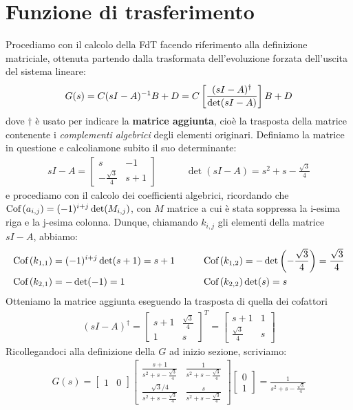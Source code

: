 \documentclass[a4paper, 11pt]{article}
\begin{document}
\section{Funzione di trasferimento}
Procediamo con il calcolo della FdT facendo riferimento alla definizione matriciale, ottenuta partendo dalla trasformata dell'evoluzione forzata dell'uscita del sistema lineare:
\begin{align*}
	G(s) = C(sI-A)^{-1}B +D = C\left[ \frac{(sI-A)^\dag}{\det(sI-A)} \right]B + D
\end{align*}
dove $\dag$ è usato per indicare la \textbf{matrice aggiunta}, cioè la trasposta della matrice contenente i \textit{complementi algebrici} degli elementi originari. Definiamo la matrice in questione e calcoliamone subito il suo determinante:
\begin{align*}
	sI-A = \begin{bmatrix}
		s & -1 \\ -\frac{\sqrt{3}}{4} & s+1
	\end{bmatrix} \quad \quad \quad \det(sI-A) = s^2+s - \frac{\sqrt{3}}{4}
\end{align*}
e procediamo con il calcolo dei coefficienti algebrici, ricordando che $\textrm{Cof}\left( a_{i,j} \right) = (-1)^{i+j}\det(M_{i,j})$, con $M$ matrice a cui è stata soppressa la i-esima riga e la j-esima colonna. Dunque, chiamando $k_{i,j}$ gli elementi della matrice $sI-A$, abbiamo:
\begin{align*}
	\textrm{Cof}\left( k_{1,1} \right) & = (-1)^{i+j} \det(s+1) = s+1 \quad & \quad \textrm{Cof}\left( k_{1,2} \right) & = -\det\left( -\frac{\sqrt{3}}{4} \right) = \frac{\sqrt{3}}{{4}} \\
	\textrm{Cof}\left( k_{2,1} \right) & = -\det(-1) = 1 \quad & \quad \textrm{Cof}\left( k_{2,2} \right) & \det(s) = s 
\end{align*}
Otteniamo la matrice aggiunta eseguendo la trasposta di quella dei cofattori
\begin{align*}
	(sI-A)^\dag = \begin{bmatrix}
		s+1 & \frac{\sqrt{3}}{4} \\ 
		1 & s
	\end{bmatrix}^T = \begin{bmatrix}
		s+ 1 & 1 \\
		\frac{\sqrt{3}}{4} & s
	\end{bmatrix}
\end{align*}
Ricollegandoci alla definizione della $G$ ad inizio sezione, scriviamo:
\begin{align*}
	G(s) = \begin{bmatrix} 1 & 0 \end{bmatrix} \begin{bmatrix}
		\frac{s+1}{s^2+s - \frac{\sqrt{3}}{4}} & \frac{1}{s^2+s - \frac{\sqrt{3}}{4}} \\
		\frac{\sqrt{3}/4}{s^2+s - \frac{\sqrt{3}}{4}} & \frac{s}{s^2+s - \frac{\sqrt{3}}{4}}
	\end{bmatrix} \begin{bmatrix}
		0 \\ 1
	\end{bmatrix} = \frac{1}{s^2+s - \frac{\sqrt{3}}{4}}
\end{align*}
\end{document}
